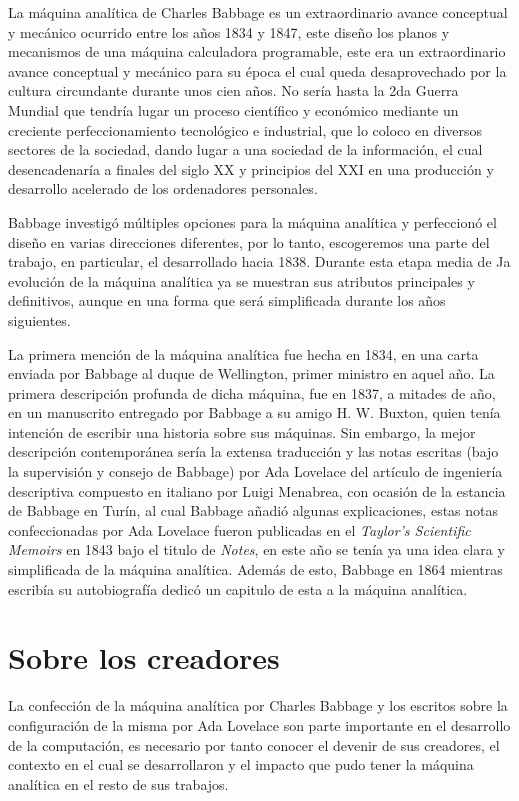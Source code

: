 \documentclass[runningheads,a4paper]{llncs}
\begin{document}
La máquina analítica de Charles Babbage es un extraordinario avance conceptual y mecánico ocurrido
entre los años 1834 y 1847, este diseño los planos y mecanismos de una máquina calculadora programable, 
este era un extraordinario avance conceptual y mecánico para su época el cual queda desaprovechado
por la cultura circundante durante unos cien años. No sería hasta la 2da Guerra Mundial que tendría lugar
un proceso científico y económico mediante un creciente perfeccionamiento tecnológico e industrial, 
que lo coloco en diversos sectores de la sociedad, dando lugar a una sociedad de la información, el 
cual desencadenaría a finales del siglo XX y principios del XXI en una producción y desarrollo acelerado 
de los ordenadores personales.

Babbage investigó múltiples opciones para la máquina analítica y perfeccionó el diseño en varias direcciones
diferentes, por lo tanto, escogeremos una parte del trabajo, en particular, el desarrollado hacia 1838. 
Durante esta etapa media de Ja evolución de la máquina analítica ya se muestran sus atributos principales 
y definitivos, aunque en una forma que será simplificada durante los años siguientes.

La primera mención de la máquina analítica fue hecha en 1834, en una carta enviada por Babbage al 
duque de Wellington, primer ministro en aquel año. La primera descripción profunda de dicha máquina, 
fue en 1837, a mitades de año, en un manuscrito entregado por Babbage a su amigo H. W. Buxton, quien 
tenía intención de escribir una historia sobre sus máquinas. Sin embargo, la mejor descripción contemporánea 
sería la extensa traducción y las notas escritas (bajo la supervisión y consejo de Babbage) por Ada 
Lovelace del artículo de ingeniería descriptiva compuesto en italiano por Luigi Menabrea, con ocasión 
de la estancia de Babbage en Turín, al cual Babbage añadió algunas explicaciones, estas notas confeccionadas 
por Ada Lovelace fueron publicadas en el \emph{Taylor’s Scientific Memoirs} en 1843 bajo el titulo de 
\emph{Notes}, en este año se tenía ya una idea clara y simplificada de la máquina analítica. 
Además de esto, Babbage en 1864 mientras escribía su autobiografía dedicó un capitulo de esta a la 
máquina analítica.

\section{Sobre los creadores}

La confección de la máquina analítica por Charles Babbage y los escritos sobre la configuración de la misma por Ada Lovelace son parte importante en el desarrollo de la computación, es necesario por tanto conocer el devenir de sus creadores, el contexto en el cual se desarrollaron y el impacto que pudo tener la máquina analítica en el resto de
sus trabajos.
\end{document}
